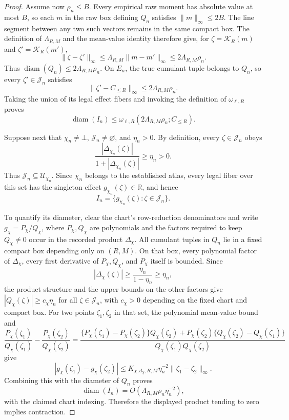 \documentclass{article}
\begin{document}
\begin{proof}
Assume now \(\rho_n\le B\).  Every empirical raw moment has absolute value at most \(B\), so each \(m\) in the raw box defining \(Q_n\) satisfies \(\|m\|_\infty\le2B\).  The line segment between any two such vectors remains in the same compact box.  The definition of \(\Lambda_{R,M}\) and the mean-value identity therefore give, for \(\zeta=\mathcal K_R(m)\) and \(\zeta'=\mathcal K_R(m')\),
\[
 \|\zeta-\zeta'\|_\infty
 \le\Lambda_{R,M}\|m-m'\|_\infty
 \le2\Lambda_{R,M}\rho_n.
\]
Thus \(\operatorname{diam}(Q_n)\le2\Lambda_{R,M}\rho_n\).  On \(E_n\), the true cumulant tuple belongs to \(Q_n\), so every \(\zeta'\in\mathcal J_n\) satisfies
\[
 \|\zeta'-C_{\le R}\|_\infty\le2\Lambda_{R,M}\rho_n.
\]
Taking the union of its legal effect fibers and invoking the definition of \(\omega_{\ell,R}\) proves
\[
 \operatorname{diam}(I_n)
 \le\omega_{\ell,R}(2\Lambda_{R,M}\rho_n;C_{\le R}).
\]

Suppose next that \(\chi_n\ne\bot\), \(\mathcal J_n\ne\varnothing\), and \(\eta_n>0\).  By definition, every \(\zeta\in\mathcal J_n\) obeys
\[
 \frac{|\Delta_{\chi_n}(\zeta)|}{1+|\Delta_{\chi_n}(\zeta)|}\ge\eta_n>0.
\]
Thus \(\mathcal J_n\subseteq\mathcal U_{\chi_n}\).  Since \(\chi_n\) belongs to the established atlas, every legal fiber over this set has the singleton effect \(g_{\chi_n}(\zeta)\in\mathbb R\), and hence
\[
 I_n=\{g_{\chi_n}(\zeta):\zeta\in\mathcal J_n\}.
\]

To quantify its diameter, clear the chart's row-reduction denominators and write \(g_{\chi}=P_\chi/Q_\chi\), where \(P_\chi,Q_\chi\) are polynomials and the factors required to keep \(Q_\chi\ne0\) occur in the recorded product \(\Delta_\chi\).  All cumulant tuples in \(Q_n\) lie in a fixed compact box depending only on \((R,M)\).  On that box, every polynomial factor of \(\Delta_\chi\), every first derivative of \(P_\chi,Q_\chi\), and \(P_\chi\) itself is bounded.  Since
\[
 |\Delta_\chi(\zeta)|\ge\frac{\eta_n}{1-\eta_n}\ge\eta_n,
\]
the product structure and the upper bounds on the other factors give \(|Q_\chi(\zeta)|\ge c_\chi\eta_n\) for all \(\zeta\in\mathcal J_n\), with \(c_\chi>0\) depending on the fixed chart and compact box.  For two points \(\zeta_1,\zeta_2\) in that set, the polynomial mean-value bound and
\[
 \frac{P_\chi(\zeta_1)}{Q_\chi(\zeta_1)}-
 \frac{P_\chi(\zeta_2)}{Q_\chi(\zeta_2)}
 =\frac{\{P_\chi(\zeta_1)-P_\chi(\zeta_2)\}Q_\chi(\zeta_2)
       +P_\chi(\zeta_2)\{Q_\chi(\zeta_2)-Q_\chi(\zeta_1)\}}
       {Q_\chi(\zeta_1)Q_\chi(\zeta_2)}
\]
give
\[
 |g_\chi(\zeta_1)-g_\chi(\zeta_2)|
 \le K_{\chi,d_\chi,R,M}\eta_n^{-2}
       \|\zeta_1-\zeta_2\|_\infty.
\]
Combining this with the diameter of \(Q_n\) proves
\[
 \operatorname{diam}(I_n)=O(\Lambda_{R,M}\rho_n\eta_n^{-2}),
\]
with the claimed chart indexing.  Therefore the displayed product tending to zero implies contraction.


\end{proof}
\end{document}
